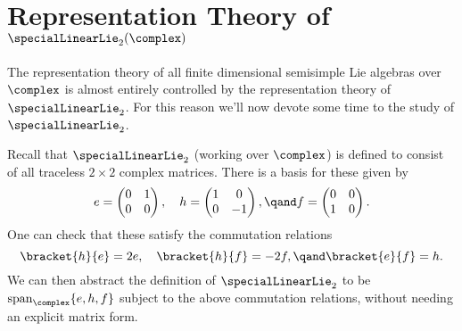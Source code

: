 \documentclass[fleqn]{NotesClass}
\DeclareMathOperator{\Span}{span}
\begin{document}
    \section{Representation Theory of \texorpdfstring{\(\specialLinearLie_2(\complex)\)}{sl2}}
    The representation theory of all finite dimensional semisimple Lie algebras over \(\complex\) is almost entirely controlled by the representation theory of \(\specialLinearLie_2\).
    For this reason we'll now devote some time to the study of \(\specialLinearLie_2\).
    
    Recall that \(\specialLinearLie_2\) (working over \(\complex\)) is defined to consist of all traceless \(2 \times 2\) complex matrices.
    There is a basis for these given by
    \begin{equation}
        e = 
        \begin{pmatrix}
            0 & 1\\
            0 & 0
        \end{pmatrix}
        , \quad 
        h = 
        \begin{pmatrix}
            1 & 0\\
            0 & -1
        \end{pmatrix}
        ,\qand f =
        \begin{pmatrix}
            0 & 0\\
            1 & 0
        \end{pmatrix}
        .
    \end{equation}
    One can check that these satisfy the commutation relations
    \begin{equation}
        \bracket{h}{e} = 2e, \quad \bracket{h}{f} = -2f, \qand \bracket{e}{f} = h.
    \end{equation}
    We can then abstract the definition of \(\specialLinearLie_2\) to be \(\Span_{\complex}\{e, h, f\}\) subject to the above commutation relations, without needing an explicit matrix form.
    
\end{document}
